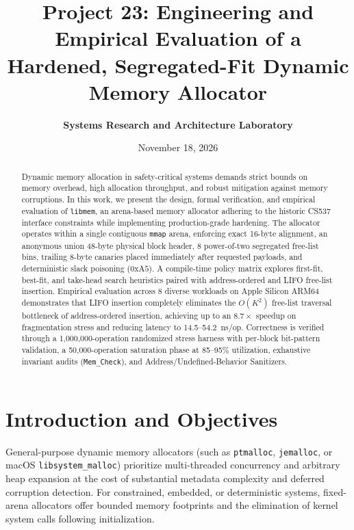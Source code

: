 \documentclass[11pt,a4paper]{article}
\title{\textbf{Project 23: Engineering and Empirical Evaluation of a Hardened, Segregated-Fit Dynamic Memory Allocator}}
\author{\textbf{Systems Research and Architecture Laboratory}}
\date{November 18, 2026}
\begin{document}
\maketitle

\begin{abstract}
Dynamic memory allocation in safety-critical systems demands strict bounds on memory overhead, high allocation throughput, and robust mitigation against memory corruptions. In this work, we present the design, formal verification, and empirical evaluation of \texttt{libmem}, an arena-based memory allocator adhering to the historic CS537 interface constraints while implementing production-grade hardening. The allocator operates within a single contiguous \texttt{mmap} arena, enforcing exact 16-byte alignment, an anonymous union 48-byte physical block header, 8 power-of-two segregated free-list bins, trailing 8-byte canaries placed immediately after requested payloads, and deterministic slack poisoning ($0\text{xA5}$). A compile-time policy matrix explores first-fit, best-fit, and take-head search heuristics paired with address-ordered and LIFO free-list insertion. Empirical evaluation across 8 diverse workloads on Apple Silicon ARM64 demonstrates that LIFO insertion completely eliminates the $O(K^2)$ free-list traversal bottleneck of address-ordered insertion, achieving up to an $8.7\times$ speedup on fragmentation stress and reducing latency to 14.5--54.2~ns/op. Correctness is verified through a 1,000,000-operation randomized stress harness with per-block bit-pattern validation, a 50,000-operation saturation phase at 85--95\% utilization, exhaustive invariant audits (\texttt{Mem\_Check}), and Address/Undefined-Behavior Sanitizers.
\end{abstract}

\section{Introduction and Objectives}
General-purpose dynamic memory allocators (such as \texttt{ptmalloc}, \texttt{jemalloc}, or macOS \texttt{libsystem\_malloc}) prioritize multi-threaded concurrency and arbitrary heap expansion at the cost of substantial metadata complexity and deferred corruption detection. For constrained, embedded, or deterministic systems, fixed-arena allocators offer bounded memory footprints and the elimination of kernel system calls following initialization.
\end{document}
